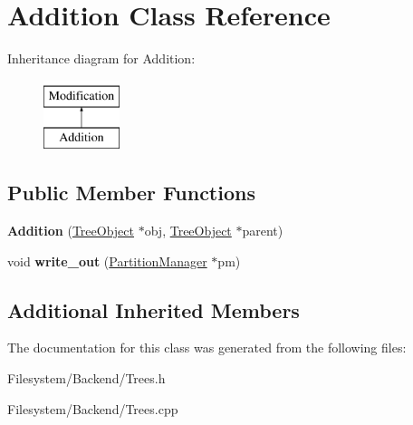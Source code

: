 \hypertarget{classAddition}{}\section{Addition Class Reference}
\label{classAddition}
Inheritance diagram for Addition\+:\begin{figure}[H]
\begin{center}
\leavevmode
\includegraphics[height=2.000000cm]{classAddition}
\end{center}
\end{figure}
\subsection*{Public Member Functions}
\begin{DoxyCompactItemize}
\item 
\mbox{\label{classAddition_a0bcd6cd605c0e90a834339a1feb20901}} 
{\bfseries Addition} (\mbox{\hyperlink{classTreeObject}{Tree\+Object}} $\ast$obj, \mbox{\hyperlink{classTreeObject}{Tree\+Object}} $\ast$parent)
\item 
\mbox{\label{classAddition_a08cd2dae96a62c80d6fe62339232fbca}} 
void {\bfseries write\+\_\+out} (\mbox{\hyperlink{classPartitionManager}{Partition\+Manager}} $\ast$pm)
\end{DoxyCompactItemize}
\subsection*{Additional Inherited Members}


The documentation for this class was generated from the following files\+:\begin{DoxyCompactItemize}
\item 
Filesystem/\+Backend/Trees.\+h\item 
Filesystem/\+Backend/Trees.\+cpp\end{DoxyCompactItemize}
